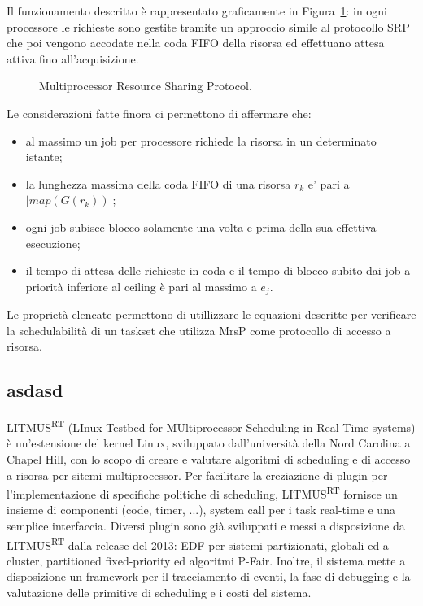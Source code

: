 Il funzionamento descritto è rappresentato graficamente in Figura~\ref{fig:locks.mrsp}: in ogni processore le richieste sono gestite tramite un approccio simile al protocollo SRP che poi vengono accodate nella coda FIFO della risorsa ed effettuano attesa attiva fino all'acquisizione.\\

\begin{figure}
\centering
{}
\caption{Multiprocessor Resource Sharing Protocol.}
\label{fig:locks.mrsp}
\end{figure}

Le considerazioni fatte finora ci permettono di affermare che:

\begin{itemize}
\item al massimo un job per processore richiede la risorsa in un determinato istante;
\item la lunghezza massima della coda FIFO di una risorsa $r_k$ e’ pari a $| map(G(r_k)) |$;
\item ogni job subisce blocco solamente una volta e prima della sua effettiva esecuzione;
\item il tempo di attesa delle richieste in coda e il tempo di blocco subito dai job a priorità inferiore al ceiling  è pari al massimo a $e_j$.
\end{itemize}

Le proprietà elencate permettono di utillizzare le equazioni descritte per verificare la schedulabilità di un taskset che utilizza MrsP come protocollo di accesso a risorsa.\\





\subsection{asdasd}
\label{sec:intro.litmus}

LITMUS\textsuperscript{RT} (LInux Testbed for MUltiprocessor Scheduling in Real-Time systems) è un'estensione del kernel Linux, sviluppato dall'università della Nord Carolina a Chapel Hill, con lo scopo di creare e valutare algoritmi di scheduling e di accesso a risorsa per sitemi multiprocessor. Per facilitare la creziazione di plugin per l'implementazione di specifiche politiche di scheduling, LITMUS\textsuperscript{RT} fornisce un insieme di componenti (code, timer, ...), system call per i task real-time e una semplice interfaccia. Diversi plugin sono già sviluppati e messi a disposizione da LITMUS\textsuperscript{RT} dalla release del 2013: EDF per sistemi partizionati, globali ed a cluster, partitioned fixed-priority ed algoritmi P-Fair. Inoltre, il sistema mette a disposizione un framework per il tracciamento di eventi, la fase di debugging e la valutazione delle primitive di scheduling e i costi del sistema.

